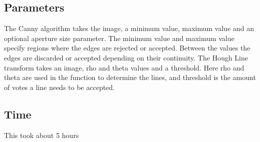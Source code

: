 \documentclass{article}
\begin{document}
\pagebreak
\subsection{Parameters}
\begin{normalsize}


The Canny algorithm takes the image, a minimum value, maximum value and an optional aperture size parameter. The minimum value and maximum value specify regions where the edges are rejected or accepted. Between the values the edges are discarded or accepted depending on their continuity. The Hough Line transform takes an image, rho and theta values and a threshold. Here rho and theta are used in the function to determine the lines, and threshold is the amount of votes a line needs to be accepted.
\end{normalsize}
\subsection{Time}
This took about 5 hours
\newpage
\end{document}
